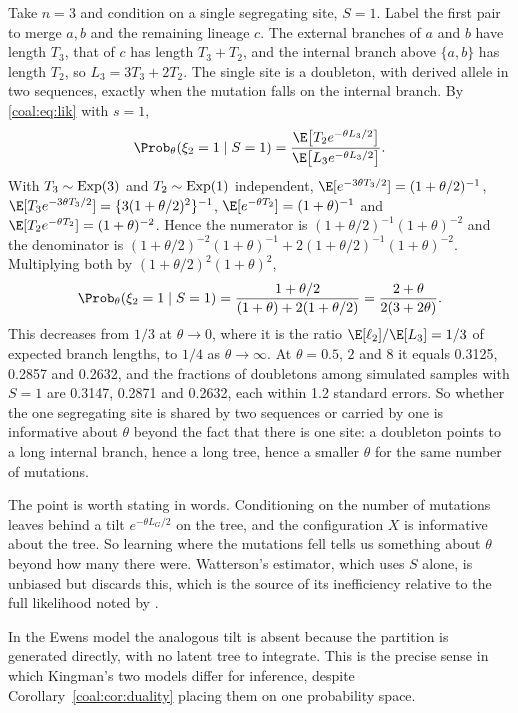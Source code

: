 \begin{example}\label{coal:ex:n3}
Take $n=3$ and condition on a single segregating site, $S=1$. Label the first pair to merge $a,b$ and the remaining lineage $c$. The external branches of $a$ and $b$ have length $T_3$, that of $c$ has length $T_3+T_2$, and the internal branch above $\{a,b\}$ has length $T_2$, so $L_3=3T_3+2T_2$. The single site is a doubleton, with derived allele in two sequences, exactly when the mutation falls on the internal branch. By \eqref{coal:eq:lik} with $s=1$,
\[
\Prob_\theta(\xi_2=1\mid S=1)=\frac{\E\bigl[T_2e^{-\theta L_3/2}\bigr]}{\E\bigl[L_3e^{-\theta L_3/2}\bigr]}.
\]
With $T_3\sim\mathrm{Exp}(3)$ and $T_2\sim\mathrm{Exp}(1)$ independent, $\E[e^{-3\theta T_3/2}]=(1+\theta/2)^{-1}$, $\E[T_3e^{-3\theta T_3/2}]=\{3(1+\theta/2)^2\}^{-1}$, $\E[e^{-\theta T_2}]=(1+\theta)^{-1}$ and $\E[T_2e^{-\theta T_2}]=(1+\theta)^{-2}$. Hence the numerator is $(1+\theta/2)^{-1}(1+\theta)^{-2}$ and the denominator is $(1+\theta/2)^{-2}(1+\theta)^{-1}+2(1+\theta/2)^{-1}(1+\theta)^{-2}$. Multiplying both by $(1+\theta/2)^2(1+\theta)^2$,
\[
\Prob_\theta(\xi_2=1\mid S=1)=\frac{1+\theta/2}{(1+\theta)+2(1+\theta/2)}=\frac{2+\theta}{2(3+2\theta)}.
\]
This decreases from $1/3$ at $\theta\to0$, where it is the ratio $\E[\ell_2]/\E[L_3]=1/3$ of expected branch lengths, to $1/4$ as $\theta\to\infty$. At $\theta=0.5$, $2$ and $8$ it equals 0.3125, 0.2857 and 0.2632, and the fractions of doubletons among simulated samples with $S=1$ are 0.3147, 0.2871 and 0.2632, each within 1.2 standard errors. So whether the one segregating site is shared by two sequences or carried by one is informative about $\theta$ beyond the fact that there is one site: a doubleton points to a long internal branch, hence a long tree, hence a smaller $\theta$ for the same number of mutations.
\end{example}

The point is worth stating in words. Conditioning on the number of mutations leaves behind a tilt $e^{-\theta L_G/2}$ on the tree, and the configuration $X$ is informative about the tree. So learning where the mutations fell tells us something about $\theta$ beyond how many there were. Watterson's estimator, which uses $S$ alone, is unbiased but discards this, which is the source of its inefficiency relative to the full likelihood noted by \citet{coal:felsenstein1992}.

\begin{remark}[Contrast]\label{coal:rem:contrast}
In the Ewens model the analogous tilt is absent because the partition is generated directly, with no latent tree to integrate. This is the precise sense in which Kingman's two models differ for inference, despite Corollary~\ref{coal:cor:duality} placing them on one probability space.
\end{remark}

